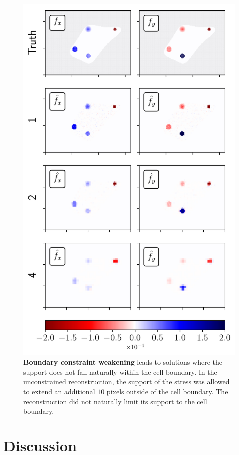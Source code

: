 \documentclass[aps,prl,reprint,twocolumn,groupedaddress,showpacs]{revtex4-1}
\begin{document}
\begin{figure}
\includegraphics[width=\linewidth]{fig4}
\caption{\textbf{Boundary constraint weakening} leads to solutions where the support does not fall naturally within the cell boundary. In the unconstrained reconstruction, the support of the stress was allowed to extend an additional $10$ pixels outside of the cell boundary. The reconstruction did not naturally limit its support to the cell boundary.}
\label{fig:fig4}
\end{figure}

\section{Discussion}
\end{document}
